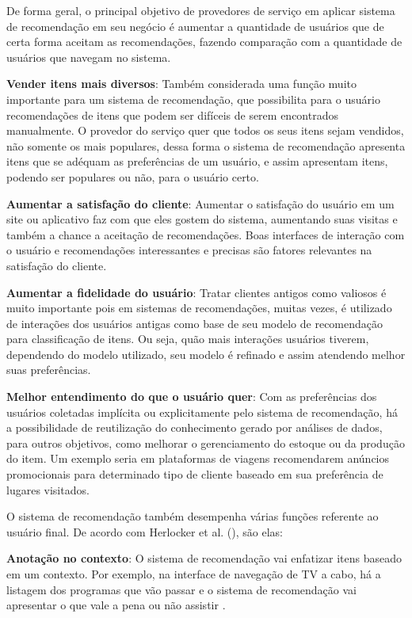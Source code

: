 De forma geral, o principal objetivo de provedores de serviço em aplicar sistema de recomendação em seu negócio é aumentar a quantidade de usuários que de certa forma aceitam as recomendações, fazendo comparação com a quantidade de usuários que navegam no sistema.

\textbf{Vender itens mais diversos}: Também considerada uma função muito importante para um sistema de recomendação, que possibilita para o usuário recomendações de itens que podem ser difíceis de serem encontrados manualmente. O provedor do serviço quer que todos os seus itens sejam vendidos, não somente os mais populares, dessa forma o sistema de recomendação apresenta itens que se adéquam as preferências de um usuário, e assim apresentam itens, podendo ser populares ou não, para o usuário certo.

\textbf{Aumentar a satisfação do cliente}: Aumentar o satisfação do usuário em um site ou aplicativo faz com que eles gostem do sistema, aumentando suas visitas e também a chance a aceitação de recomendações. Boas interfaces de interação com o usuário e recomendações interessantes e precisas são fatores relevantes na satisfação do cliente.

\textbf{Aumentar a fidelidade do usuário}: Tratar clientes antigos como valiosos é muito importante pois em sistemas de recomendações, muitas vezes, é utilizado de interações dos usuários antigas como base de seu modelo de recomendação para classificação de itens. Ou seja, quão mais interações usuários tiverem, dependendo do modelo utilizado, seu modelo é refinado e assim atendendo melhor suas preferências.

\textbf{Melhor entendimento do que o usuário quer}: Com as preferências dos usuários coletadas implícita ou explicitamente pelo sistema de recomendação, há a possibilidade de reutilização do conhecimento gerado por análises de dados, para outros objetivos, como melhorar o gerenciamento do estoque ou da produção do item. Um exemplo seria em plataformas de viagens recomendarem anúncios promocionais para determinado tipo de cliente baseado em sua preferência de lugares visitados.

O sistema de recomendação também desempenha várias funções referente ao usuário final. De acordo com Herlocker et al. (\citeyear{Herlocker:2004}), são elas:

\textbf{Anotação no contexto}: O sistema de recomendação vai enfatizar itens baseado em um contexto. Por exemplo, na interface de navegação de TV a cabo, há a listagem dos programas que vão passar e o sistema de recomendação vai apresentar o que vale a pena ou não assistir \cite{Ricci:2010}.

